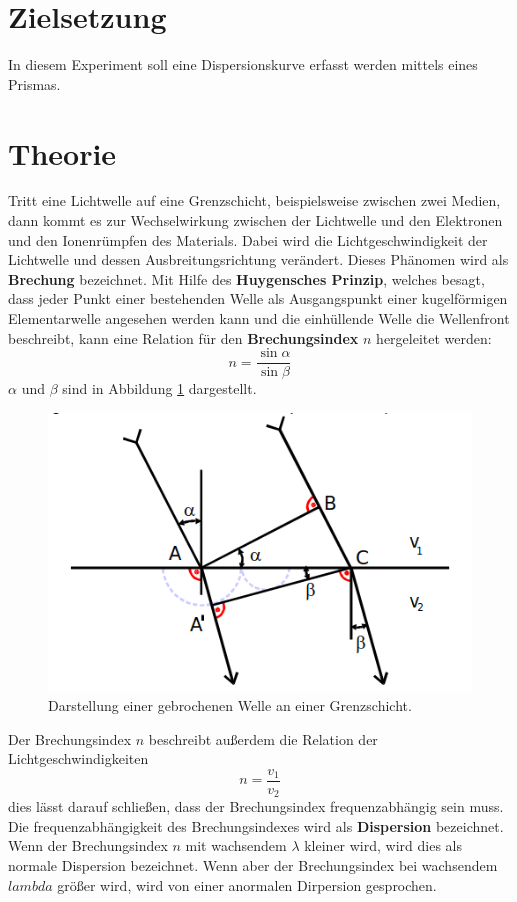 \section{Zielsetzung}
In diesem Experiment soll eine Dispersionskurve erfasst werden mittels eines Prismas.

\section{Theorie}
Tritt eine Lichtwelle auf eine Grenzschicht, beispielsweise zwischen zwei Medien, dann kommt es zur Wechselwirkung zwischen der Lichtwelle und den
Elektronen und den Ionenrümpfen des Materials. Dabei wird die Lichtgeschwindigkeit der Lichtwelle und dessen Ausbreitungsrichtung verändert. Dieses
Phänomen wird als \textbf{Brechung} bezeichnet. Mit Hilfe des \textbf{Huygensches Prinzip}, welches besagt, dass jeder Punkt einer bestehenden Welle als
Ausgangspunkt einer kugelförmigen Elementarwelle angesehen werden kann und die einhüllende Welle die Wellenfront beschreibt, kann eine Relation
für den \textbf{Brechungsindex} $n$ hergeleitet werden:
\begin{equation*}
  n=\frac{\sin\alpha}{\sin\beta}
\end{equation*}
$\alpha$ und $\beta$ sind in Abbildung \ref{abb:1} dargestellt.
\begin{figure}
  \centering
  \includegraphics[scale=0.4]{1.png}
  \caption{Darstellung einer gebrochenen Welle an einer Grenzschicht. \cite{Q1}}
  \label{abb:1}
\end{figure}
Der Brechungsindex $n$ beschreibt außerdem die Relation der Lichtgeschwindigkeiten
\begin{equation*}
  n = \frac{v_1}{v_2}
\end{equation*}
dies lässt darauf schließen, dass der Brechungsindex frequenzabhängig sein muss. Die frequenzabhängigkeit des Brechungsindexes wird als \textbf{Dispersion}
bezeichnet. Wenn der Brechungsindex $n$ mit wachsendem $\lambda$ kleiner wird, wird dies als normale Dispersion bezeichnet. Wenn aber der Brechungsindex
bei wachsendem $lambda$ größer wird, wird von einer anormalen Dirpersion gesprochen.

